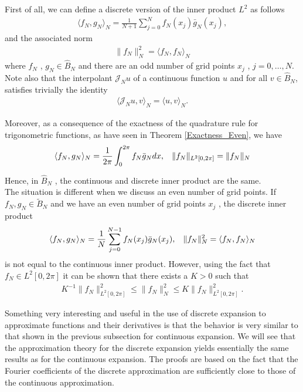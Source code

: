     \noindent First of all, we can define a discrete version of the inner product $L^2$ as follows
    \begin{align*}
    	\langle f_N, g_N \rangle_N = \displaystyle \frac{1}{N + 1} \sum_{j = 0}^{N} f_N (x_j) \bar{g}_N (x_j),
    \end{align*}
	and the associated norm
	\begin{align*}
		\| f_N \|_N^2 = \langle f_N, f_N \rangle_N
	\end{align*}
	where $f_N$ , $g_N \in \hat{B}_N$ and there are an odd number of grid points $x_j$ , $j = 0, \dots , N$. Note also that the interpolant $\mathcal{J}_N u$ of a continuous function $u$ and for all $v \in \hat{B}_N$, satisfies trivially the identity
	\begin{align*}
		\langle \mathcal{J}_N u, v \rangle_N = \langle u, v \rangle_N.
	\end{align*} 
	
	Moreover, as a consequence of the exactness of the quadrature rule for trigonometric functions, as have seen in Theorem \ref{Exactness_Even}, we have
	\begin{align}
	\label{Coincidence_Inner}	
		\langle f_N, g_N \rangle_N = \displaystyle \frac{1}{2 \pi} \int_{0}^{2 \pi} f_N \bar{g}_N dx, \hspace{3mm} \|f_N\|_{L^2 [0, 2 \pi]} = \|f_N\|_N
	\end{align}

	Hence, in $\hat{B}_N$ , the continuous and discrete inner product are the same.\\
	
	The situation is different when we discuss an even number of grid points. If $f_N , g_N \in \tilde{B}_N$ and we have an even number of grid points $x_j$ , the discrete inner product
	\begin{align*}
		\langle f_N, g_N \rangle_N = \displaystyle \frac{1}{N} \sum_{j = 0}^{N - 1} f_N (x_j) \bar{g}_N (x_j), \hspace{3mm} \|f_N\|_N^2 = \langle f_N, f_N \rangle_N
	\end{align*}
	is not equal to the continuous inner product. However, using the fact that $f_N \in L^2 [0, 2 \pi]$ it can be shown that there exists a $K > 0$ such that
	\begin{align}
	\label{equivalent_discrete_continous}
		K^{-1} \|f_N\|^2_{L^2 [0, 2 \pi]} \leq \|f_N\|^2_N \leq K \|f_N\|^2_{L^2 [0, 2 \pi]}.
	\end{align}
    
    Something very interesting and useful in the use of discrete expansion to approximate functions and their derivatives is that the behavior is very similar to that shown in the previous subsection for continuous expansion. We will see that the approximation theory for the discrete expansion yields essentially the same results as for the continuous expansion. The proofs are based on the fact that the Fourier coefficients of the discrete approximation are sufficiently close to those of the continuous approximation. \\
    
